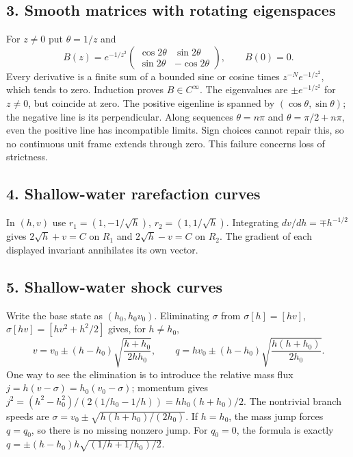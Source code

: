 \subsection*{3. Smooth matrices with rotating eigenspaces}
For $z\ne0$ put $\theta=1/z$ and
\[
 B(z)=e^{-1/z^2}\begin{pmatrix}\cos2\theta&\sin2\theta\\
 \sin2\theta&-\cos2\theta\end{pmatrix},\qquad B(0)=0.
\]
Every derivative is a finite sum of a bounded sine or cosine times
$z^{-N}e^{-1/z^2}$, which tends to zero. Induction proves $B\in C^\infty$.
The eigenvalues are $\pm e^{-1/z^2}$ for $z\ne0$, but coincide at zero.
The positive eigenline is spanned by $(\cos\theta,\sin\theta)$;
the negative line is its perpendicular. Along sequences $\theta=n\pi$
and $\theta=\pi/2+n\pi$, even the positive line has incompatible
limits. Sign choices cannot repair this, so no continuous unit
frame extends through zero. This failure concerns loss of strictness.

\subsection*{4. Shallow-water rarefaction curves}
In $(h,v)$ use $r_1=(1,-1/\sqrt h)$, $r_2=(1,1/\sqrt h)$.
Integrating $dv/dh=\mp h^{-1/2}$ gives
$2\sqrt h+v=C$ on $R_1$ and $2\sqrt h-v=C$ on $R_2$.
The gradient of each displayed invariant annihilates its own vector.

\subsection*{5. Shallow-water shock curves}
Write the base state as $(h_0,h_0v_0)$. Eliminating $\sigma$ from
$\sigma[h]=[hv]$, $\sigma[hv]=[hv^2+h^2/2]$ gives, for $h\ne h_0$,
\begin{equation}\label{eq:11-sw-shocks}
 v=v_0\pm(h-h_0)\sqrt{\frac{h+h_0}{2hh_0}},\qquad
 q=hv_0\pm(h-h_0)\sqrt{\frac{h(h+h_0)}{2h_0}}.
\end{equation}
One way to see the elimination is to introduce the relative mass flux
$j=h(v-\sigma)=h_0(v_0-\sigma)$; momentum gives
$j^2=(h^2-h_0^2)/(2(1/h_0-1/h))=hh_0(h+h_0)/2$.
The nontrivial branch speeds are
$\sigma=v_0\pm\sqrt{h(h+h_0)/(2h_0)}$.
If $h=h_0$, the mass jump forces $q=q_0$, so there is no missing
nonzero jump. For $q_0=0$, the formula is exactly
$q=\pm(h-h_0)h\sqrt{(1/h+1/h_0)/2}$.


